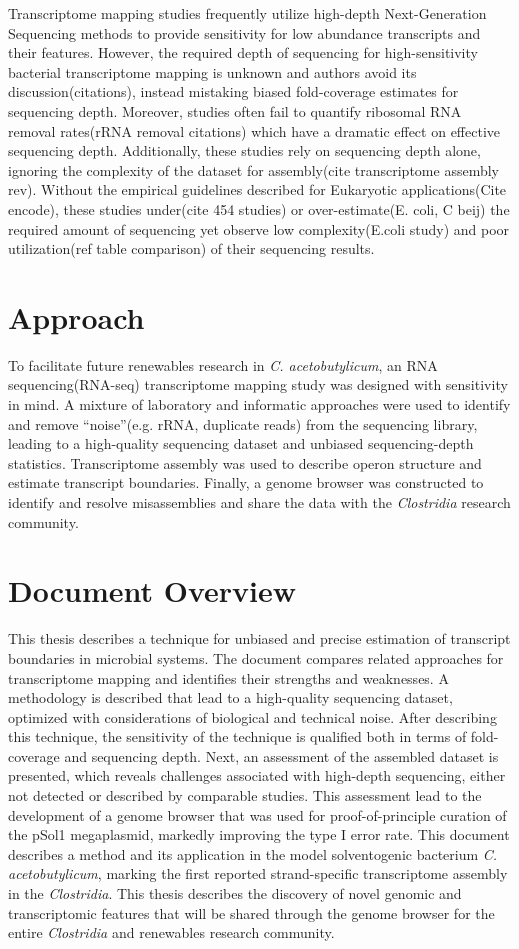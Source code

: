 Transcriptome mapping studies frequently utilize high-depth Next-Generation Sequencing methods to provide sensitivity for low abundance transcripts and their features. However, the required depth of sequencing for high-sensitivity bacterial transcriptome mapping is unknown and authors avoid its discussion(citations), instead mistaking biased fold-coverage estimates for sequencing depth. Moreover, studies often fail to quantify ribosomal RNA removal rates(rRNA removal citations) which have a dramatic effect on effective sequencing depth. Additionally, these studies rely on sequencing depth alone, ignoring the complexity of the dataset for assembly(cite transcriptome assembly rev). Without the empirical guidelines described for Eukaryotic applications(Cite encode), these studies under(cite 454 studies) or over-estimate(E. coli, C beij) the required amount of sequencing yet observe low complexity(E.coli study) and poor utilization(ref table comparison) of their sequencing results.


\section{Approach}
To facilitate future renewables research in \textit{C. acetobutylicum}, an RNA sequencing(RNA-seq) transcriptome mapping study was designed with sensitivity in mind. A mixture of laboratory and informatic approaches were used to identify and remove ``noise''(e.g. rRNA, duplicate reads) from the sequencing library, leading to a high-quality sequencing dataset and unbiased sequencing-depth statistics. Transcriptome assembly was used to describe operon structure and estimate transcript boundaries. Finally, a genome browser was constructed to identify and resolve misassemblies and share the data with the \textit{Clostridia} research community.


\section{Document Overview}
This thesis describes a technique for unbiased and precise estimation of transcript boundaries in microbial systems. The document compares related approaches for transcriptome mapping and identifies their strengths and weaknesses. A methodology is described that lead to a high-quality sequencing dataset, optimized with considerations of biological and technical noise. After describing this technique, the sensitivity of the technique is qualified both in terms of fold-coverage and sequencing depth. Next, an assessment of the assembled dataset is presented, which reveals challenges associated with high-depth sequencing, either not detected or described by comparable studies. This assessment lead to the development of a genome browser that was used for proof-of-principle curation of the pSol1 megaplasmid, markedly improving the type I error rate. This document describes a method and its application in the model solventogenic bacterium \textit{C. acetobutylicum}, marking the first reported strand-specific transcriptome assembly in the \textit{Clostridia}. This thesis describes the discovery of novel genomic and transcriptomic features that will be shared through the genome browser for the entire \textit{Clostridia} and renewables research community.

